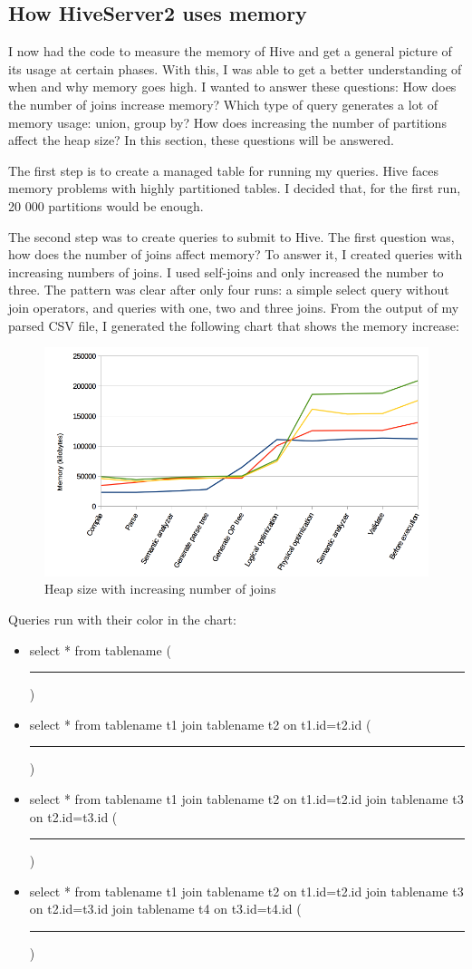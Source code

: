 \subsection{How HiveServer2 uses memory}
I now had the code to measure the memory of Hive and get a general picture of its usage at certain phases. With this, I was able to get a better understanding of when and why memory goes high. I wanted to answer these questions: How does the number of joins increase memory? Which type of query generates a lot of memory usage: union, group by? How does increasing the number of partitions affect the heap size? In this section, these questions will be answered.

The first step is to create a managed table for running my queries. Hive faces memory problems with highly partitioned tables. I decided that, for the first run, 20 000 partitions would be enough. 

The second step was to create queries to submit to Hive. The first question was, how does the number of joins affect memory? To answer it, I created queries with increasing numbers of joins. I used self-joins and only increased the number to three. The pattern was clear after only four runs: a simple select query without join operators, and queries with one, two and three joins. From the output of my parsed CSV file, I generated the following chart that shows the memory increase:

\begin{figure}[H]
	\includegraphics[width=150mm, keepaspectratio]{figures/hs2_joins_memory.png}
	\centering
	\caption{Heap size with increasing number of joins}
\end{figure}

\noindent Queries run with their color in the chart:
\begin{itemize}
	\item select * from tablename (\textcolor{blue}{\rule{2 cm}{2pt} })
	\item select * from tablename t1 join tablename t2 on t1.id=t2.id (\textcolor{orange}{\rule{2 cm}{2pt} })
	\item select * from tablename t1 join tablename t2 on t1.id=t2.id join tablename t3 on t2.id=t3.id (\textcolor{yellow}{\rule{2 cm}{2pt} })
	\item select * from tablename t1 join tablename t2 on t1.id=t2.id join tablename t3 on t2.id=t3.id join tablename t4 on t3.id=t4.id (\textcolor{green}{\rule{2 cm}{2pt} })
\end{itemize}

